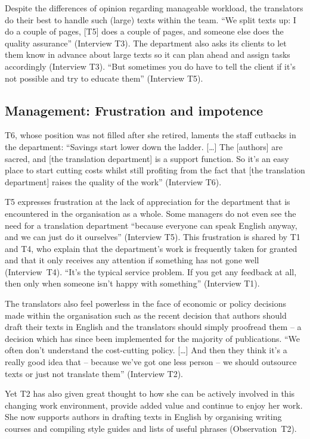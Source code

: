 \documentclass[output=paper]{langscibook}
\begin{document}
Despite the differences of opinion regarding manageable workload, the translators do their best to handle such (large) texts within the team. “We split texts up: I do a couple of pages, [T5] does a couple of pages, and someone else does the quality assurance” (Interview T3). The department also asks its clients to let them know in advance about large texts so it can plan ahead and assign tasks accordingly (Interview T3). “But sometimes you do have to tell the client if it’s not possible and try to educate them” (Interview T5).

\subsection{Management: Frustration and impotence}

T6, whose position was not filled after she retired, laments the staff cutbacks in the department: “Savings start lower down the ladder. […] The [authors] are sacred, and [the translation department] is a support function. So it’s an easy place to start cutting costs whilst still profiting from the fact that [the translation department] raises the quality of the work” (Interview T6).

T5 expresses frustration at the lack of appreciation for the department that is encountered in the organisation as a whole. Some managers do not even see the need for a translation department “because everyone can speak English anyway, and we can just do it ourselves” (Interview T5). This frustration is shared by T1 and T4, who explain that the department’s work is frequently taken for granted and that it only receives any attention if something has not gone well (Interview~T4). “It’s the typical service problem. If you get any feedback at all, then only when someone isn’t happy with something” (Interview T1).

The translators also feel powerless in the face of economic or policy decisions made within the organisation such as the recent decision that authors should draft their texts in English and the translators should simply proofread them -- a decision which has since been implemented for the majority of publications. “We often don’t understand the cost-cutting policy. […] And then they think it’s a really good idea that -- because we’ve got one less person -- we should outsource texts or just not translate them” (Interview T2).

Yet T2 has also given great thought to how she can be actively involved in this changing work environment, provide added value and continue to enjoy her work. She now supports authors in drafting texts in English by organising writing courses and compiling style guides and lists of useful phrases (Observation~T2).
\end{document}
